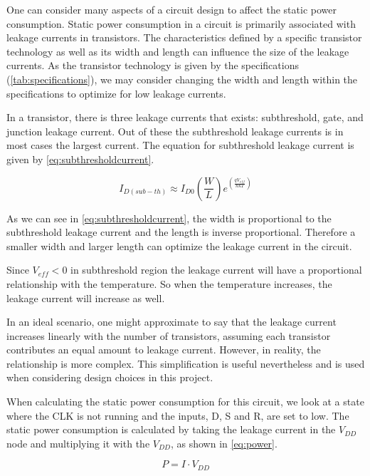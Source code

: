 One can consider many aspects of a circuit design to affect the static power consumption. Static power consumption in a circuit is primarily associated with leakage currents in transistors. The characteristics defined by a specific transistor technology as well as its width and length can influence the size of the leakage currents. As the transistor technology is given by the specifications (\ref{tab:specifications}), we may consider changing the width and length within the specifications to optimize for low leakage currents. 

In a transistor, there is three leakage currents that exists: subthreshold, gate, and
junction leakage current. Out of these the subthreshold leakage currents is in most cases the largest current. \cite{Analog_integrated} The equation for subthreshold leakage current is given by \autoref{eq:subthresholdcurrent}. 

\begin{equation}
    \label{eq:subthresholdcurrent}
    I_{D(sub-th)} \approx I_{D0}\left(\frac{W}{L}\right)e^{\left(\frac{qV_{eff}}{nkT}\right)}
\end{equation}

As we can see in \autoref{eq:subthresholdcurrent}, the width is proportional to the subthreshold leakage current and the length is inverse proportional. Therefore a smaller width and larger length can optimize the leakage current in the circuit.

Since $V_{eff} < 0$ in subthreshold region the leakage current will have a proportional relationship with the temperature. So when the temperature increases, the leakage current will increase as well. 

In an ideal scenario, one might approximate to say that the leakage current increases linearly with the number of transistors, assuming each transistor contributes an equal amount to leakage current. However, in reality, the relationship is more complex. This simplification is useful nevertheless and is used when considering design choices in this project.

When calculating the static power consumption for this circuit, we look at a state where the CLK is not running and the inputs, D, S and R, are set to low. The static power consumption is calculated by taking the leakage current in the $V_{DD}$ node and multiplying it with the $V_{DD}$, as shown in \autoref{eq:power}.

\begin{equation}
    \label{eq:power}
    P = I \cdot V_{DD}
\end{equation}

